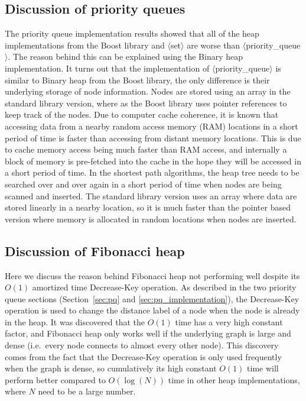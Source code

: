 \subsection{Discussion of priority queues}
The priority queue implementation results showed that
all of the heap implementations from the Boost library and $\langle$set$\rangle$ are worse than $\langle$priority\_queue$\rangle$.
The reason behind this can be explained using the Binary heap implementation.
It turns out that the implementation of $\langle$priority\_queue$\rangle$ is similar to Binary heap from the Boost library,
the only difference is their underlying storage of node information.
Nodes are stored using an array in the standard library version,
where as the Boost library uses pointer references to keep track of 
the nodes.
Due to computer cache coherence,
it is known that accessing data from a nearby random access memory (RAM) locations in a short period of time is faster than accessing from distant memory locations.
This is due to cache memory access being much faster than RAM access,
and internally a block of memory is pre-fetched into the cache in the hope they will be accessed in a short period of time.
In the shortest path algorithms,
the heap tree needs to be searched over and over again in a short period of time when nodes are being scanned and inserted.
The standard library version uses an array where data are stored linearly in a nearby location,
so it is much faster than the pointer based version where memory is allocated in random locations when nodes are inserted.

\subsection{Discussion of Fibonacci heap}
Here we discuss the reason behind Fibonacci heap not performing well despite its $O(1)$ amortized time Decrease-Key operation.
As described in the two priority queue sections (Section~\ref{sec:pq} and \ref{sec:pq_implementation}),
the Decrease-Key operation is used to change the distance label of a node when the node is already in the heap.
It was discovered that the $O(1)$ time has a very high constant factor,
and Fibonacci heap only works well if the underlying graph is large and dense (i.e.\ every node connects to almost every other node).
This discovery comes from the fact that 
the Decrease-Key operation is only used frequently when the graph is dense,
so cumulatively its high constant $O(1)$ time will perform better compared to $O(\log(N))$ time in other heap implementations, where $N$ need to be a large number.

